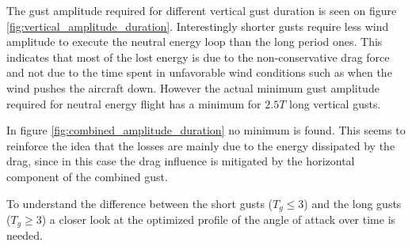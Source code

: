 \par The gust amplitude required for different vertical gust duration is seen on figure \ref{fig:vertical_amplitude_duration}.
Interestingly shorter gusts require less wind amplitude to execute the neutral energy loop than the long period ones.
This indicates that most of the lost energy is due to the non-conservative drag force and not due to the time spent in unfavorable wind conditions such as when the wind pushes the aircraft down.
However the actual minimum gust amplitude required for neutral energy flight has a minimum for $2.5T$ long vertical gusts.

\par In figure \ref{fig:combined_amplitude_duration} no minimum is found.
This seems to reinforce the idea that the losses are mainly due to the energy dissipated by the drag, since in this case the drag influence is mitigated by the horizontal component of the combined gust.

%
%
%
%


\FloatBarrier

\par To understand the difference between the short gusts ($T_g \leq 3$) and the long gusts ($T_g \geq 3$) a closer look at the optimized profile of the angle of attack over time is needed.


